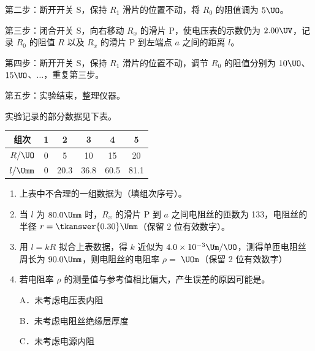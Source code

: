 \documentclass[\gkver]{gaokaozhenti}
\begin{document}
\begin{enumerate}
第二步：断开开关 S，保持 $R_{1}$ 滑片的位置不动，将 $R_{0}$ 的阻值调为 $5\UO$。

第三步：闭合开关 S，向右移动 $R_{x}$ 的滑片 P，使电压表的示数仍为 $2.00\UV$，记录 $R_{0}$ 的阻值 $R$ 以及 $R_{x}$ 的滑片 P 到左端点 $a$ 之间的距离 $l$。

第四步：断开开关 S，保持 $R_{1}$ 滑片的位置不动，调节 $R_{0}$ 的阻值分别为 $10\UO$、$15\UO$、$\ldots$，重复第三步。

第五步：实验结束，整理仪器。

实验记录的部分数据见下表。

\begin{center}
\begin{tabular}{|c|c|c|c|c|c|}
\hline
组次 & 1 & 2 & 3 & 4 & 5 \\
\hline
$R/\UO$ & 0 & 5 & 10 & 15 & 20 \\
\hline
$l/\Umm$ & 0 & 20.3 & 36.8 & 60.5 & 81.1 \\
\hline
\end{tabular}
\end{center}

\begin{enumerate}
	\item
	上表中不合理的一组数据为（填组次序号）。

	\item
	当 $l$ 为 $80.0\Umm$ 时，$R_{x}$ 的滑片 P 到 $a$ 之间电阻丝的匝数为 133，电阻丝的半径 $r=\tkanswer{0.30}\Umm$（保留 2 位有效数字）。

	\item
	用 $l=kR$ 拟合上表数据，得 $k$ 近似为 $4.0\times10^{-3}\Um/\UO$，测得单匝电阻丝周长为 $90.0\Umm$，则电阻丝的电阻率 $\rho=$ $\UOm$（保留 2 位有效数字）

	\item
	若电阻率 $\rho$ 的测量值与参考值相比偏大，产生误差的原因可能是。

	A．未考虑电压表内阻

	B．未考虑电阻丝绝缘层厚度

	C．未考虑电源内阻
\end{enumerate}


\end{enumerate}
\end{document}
